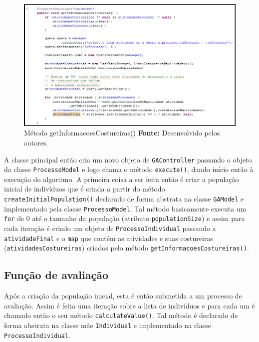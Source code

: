 \begin{figure}[h!]
	\centerline{\includegraphics[scale=0.7]{./imagens/metodo_informacoes_costureiras.png}}
	\caption[Distribuição de lotes]
	{Método getInformacoesCostureiras() \textbf{Fonte:} Desenvolvido pelos
	autores.}
	\label{fig:exemplo1}
\end{figure}



\par A classe principal então cria um novo objeto de \texttt{GAController} passando o objeto da classe \texttt{ProcessoModel} e
logo chama o método \texttt{execute()}, dando início então à execução do
algoritmo. A primeira coisa a ser feita então é criar a população inicial de indivíduos que é criada a 
partir do método \texttt{createInitialPopulation()} declarado de forma 
abstrata na classe \texttt{GAModel} e implementado pela classe \texttt{ProcessoModel}. Tal método basicamente executa um 
\texttt{for} de 0 até o tamanho da população (atributo \texttt{populationSize})
e assim para cada iteração é criado um objeto de \texttt{ProcessoIndividual} passando a \texttt{atividadeFinal} e o 
\texttt{map} que contém as atividades e suas costureiras
(\texttt{atividadesCostureiras}) criados pelo método \texttt{getInformacoesCostureiras()}.



\subsection{Função de avaliação}

\par Após a criação da população inicial, esta é então submetida a um processo
de avaliação. Assim é feita uma iteração sobre a lista de indivíduos e para cada um é chamado então o seu método 
\texttt{calculateValue()}. Tal método é declarado de forma abstrata na classe mãe
\texttt{Individual} e implementado na classe \texttt{ProcessoIndividual}.

